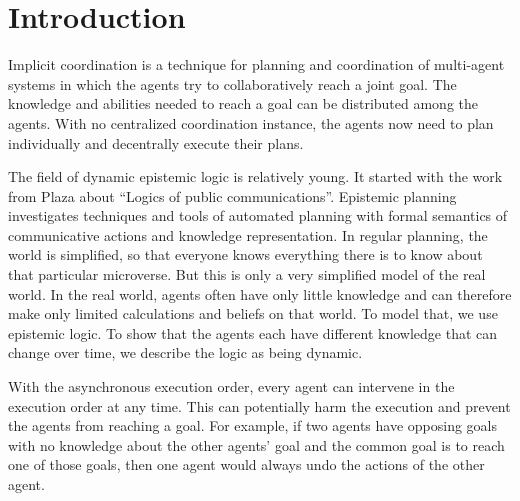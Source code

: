 \chapter{Introduction}\label{chap:introduction}





Implicit coordination is a technique for planning and coordination of multi-agent systems in which the agents try to collaboratively reach a joint goal. The knowledge and abilities needed to reach a goal can be distributed among the agents. With no centralized coordination instance, the agents now need to plan individually and decentrally execute their plans.


The field of dynamic epistemic logic is relatively young. It started with the work from Plaza \cite{plaza1989logics} about ``Logics of public communications''.
Epistemic planning investigates techniques and tools of automated planning with formal semantics of communicative actions and knowledge representation.
In regular planning, the world is simplified, so that everyone knows everything there is to know about that particular microverse. But this is only a very simplified model of the real world. In the real world, agents often have only little knowledge and can therefore make only limited calculations and beliefs on that world. To model that, we use epistemic logic. To show that the agents each have different knowledge that can change over time, we describe the logic as being dynamic.

With the asynchronous execution order, every agent can intervene in the execution order at any time. This can potentially harm the execution and prevent the agents from reaching a goal. For example, if two agents have opposing goals with no knowledge about the other agents' goal and the common goal is to reach one of those goals, then one agent would always undo the actions of the other agent.

